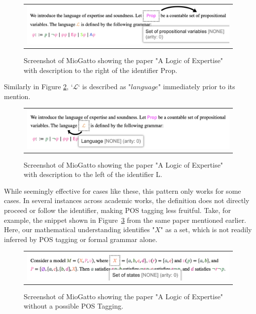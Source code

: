\begin{figure}[htpb]
  \centering
  \begin{tabular}{c}
  \includegraphics[width=14cm]{images/POS_right.png}
  \end{tabular}
  \caption[POS Tagging Right]{Screenshot of MioGatto showing the paper "A Logic of Expertise" with description to the right of the identifier Prop.}\label{fig:POS_right}
\end{figure}

Similarly in Figure \ref{fig:POS_left}, `$\mathcal{L}$` is described as "$language$" immediately prior to its mention.

\begin{figure}[htpb]
  \centering
  \begin{tabular}{c}
  \includegraphics[width=14cm]{images/POS_left.png}
  \end{tabular}
  \caption[POS Tagging Left]{Screenshot of MioGatto showing the paper "A Logic of Expertise" with description to the left of the identifier L.}\label{fig:POS_left}
\end{figure}

While seemingly effective for cases like these, this pattern only works for some cases. In several instances across academic works, the definition does not directly proceed or follow the identifier, making POS tagging less fruitful. Take, for example, the snippet shown in Figure~\ref{fig:POS_failed} from the same paper mentioned earlier. Here, our mathematical understanding identifies "$X$" as a set, which is not readily inferred by POS tagging or formal grammar alone.

\begin{figure}[htpb]
  \centering
  \begin{tabular}{c}
  \includegraphics[width=14cm]{images/POS_failed.png}
  \end{tabular}
  \caption[POS Tagging Left]{Screenshot of MioGatto showing the paper "A Logic of Expertise" without a possible POS Tagging.}\label{fig:POS_failed}
\end{figure}

